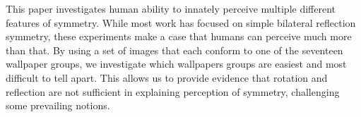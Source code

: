 This paper investigates human ability to innately perceive multiple different features of symmetry. While most work has focused on simple bilateral reflection symmetry, these experiments make a case that humans can perceive much more than that. By using a set of images that each conform to one of the seventeen wallpaper groups, we investigate which wallpapers groups are easiest and most difficult to tell apart. This allows us to provide evidence that rotation and reflection are not sufficient in explaining perception of symmetry, challenging some prevailing notions.

